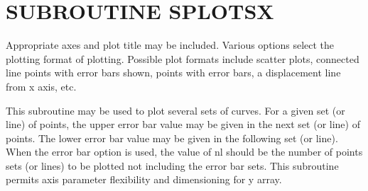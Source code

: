 \documentclass[11pt]{report}
\begin{document}
\section{SUBROUTINE SPLOTSX}

Appropriate axes and plot title may be included.
Various options select the plotting format of plotting.  Possible plot
formats include scatter plots, connected line points with error bars
shown, points with error bars, a displacement line from x axis, etc. 

This subroutine may be used to plot several sets of curves.  For a given
set (or line) of points, the upper error bar value may be given in the 
next set (or line) of points.  The lower error bar value may be given in
the following set (or line).  When the error bar option is used, the value
of nl should be the number of points sets (or lines) to be plotted not
including the error bar sets.  This subroutine permits axis parameter
flexibility and dimensioning for y array.
\end{document}
